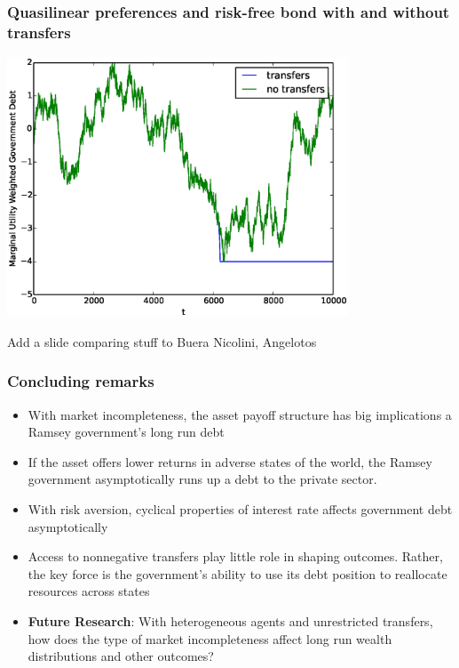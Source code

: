\documentclass{beamer}
\begin{document}
 \begin{frame}
	\frametitle{Quasilinear preferences and risk-free bond  with and without transfers}
	\begin{center}
	\includegraphics[width=4in]{Images/transfer_example2.eps}
	\end{center}
\end{frame}

\begin{frame}
 Add a slide comparing stuff to Buera Nicolini, Angelotos
\end{frame}

 \begin{frame}
  \frametitle{Concluding remarks }
\begin{itemize}
	\item With market incompleteness, the asset payoff structure  has big implications a Ramsey government's  long run debt
	\item If the asset offers lower returns in adverse states of the world, the Ramsey government  asymptotically runs up a  debt to the private sector.
\item With risk aversion, cyclical properties of interest rate affects government debt asymptotically
	\item  Access to nonnegative transfers play little role in shaping outcomes.  Rather, the key  force is the government's ability to use its debt position to reallocate resources across states
	\item  \textbf{Future Research}:   With heterogeneous agents and unrestricted transfers, how does the type of market incompleteness affect long run wealth distributions and other outcomes?
\end{itemize}
 \end{frame}

  
\end{document}
